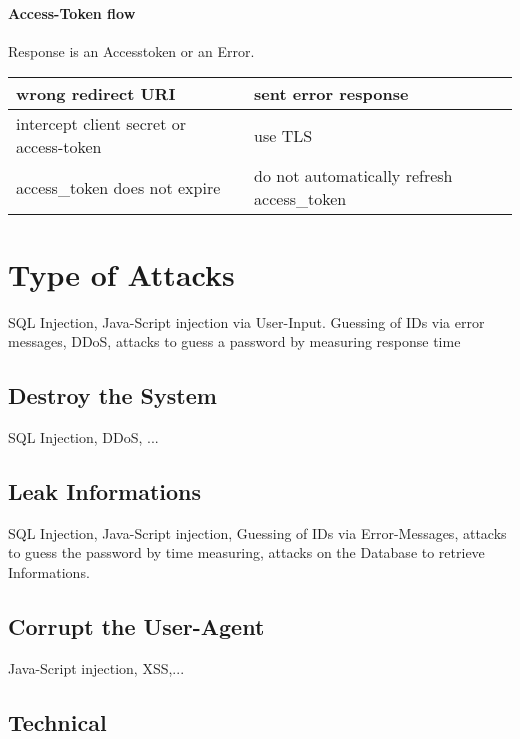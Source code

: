 \paragraph{Access-Token flow}

Response is an Accesstoken or an Error.

\begin{tabular}{|l|l|}
    \hline
    wrong redirect URI & sent error response\\
    \hline
    intercept client secret or access-token & use TLS \\
    \hline
    access\_token does not expire & do not automatically refresh access\_token \\
    \hline
 \end{tabular}

\section{Type of Attacks}
SQL Injection, Java-Script injection via User-Input.
Guessing of IDs via error messages, DDoS, 
attacks to guess a password by measuring response time
\subsection{Destroy the System}
SQL Injection, DDoS, ...

\subsection{Leak Informations}
SQL Injection, Java-Script injection, Guessing of IDs via Error-Messages, 
attacks to guess the password by time measuring, attacks on the Database to retrieve Informations.

\subsection{Corrupt the User-Agent}
Java-Script injection, XSS,...

\subsection{Technical}

